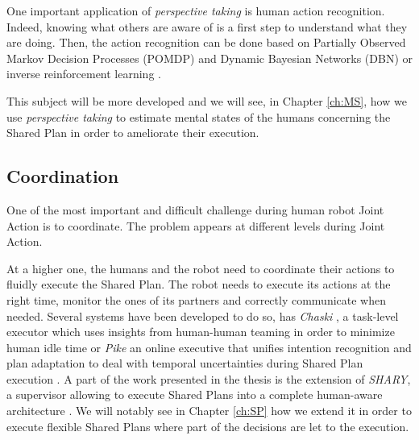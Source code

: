 \documentclass[english,a4paper,11pt,twoside]{StyleThese}
\begin{document}
One important application of \textit{perspective taking} is human action recognition. Indeed, knowing what others are aware of is a first step to understand what they are doing. Then, the action recognition can be done based on Partially Observed Markov Decision Processes (POMDP) and Dynamic Bayesian Networks (DBN) \cite{baker2014modeling} or inverse reinforcement learning \cite{nagai2015probabilistic}.

This subject will be more developed and we will see, in Chapter \ref{ch:MS}, how we use \textit{perspective taking} to estimate mental states of the humans concerning the Shared Plan in order to ameliorate their execution.


\subsection{Coordination}

\label{subsec:coordination_robot}

One of the most important and difficult challenge during human robot Joint Action is to coordinate. The problem appears at different levels during Joint Action. 

At a higher one, the humans and the robot need to coordinate their actions to fluidly execute the Shared Plan. The robot needs to execute its actions at the right time, monitor the ones of its partners and correctly communicate when needed. Several systems have been developed to do so, has \textit{Chaski} \cite{shah2011improved}, a task-level executor which uses insights from human-human teaming in order to minimize human idle time or \textit{Pike} an online executive that unifies intention recognition and plan adaptation to deal with temporal uncertainties during Shared Plan execution \cite{karpas2015robust}. A part of the work presented in the thesis is the extension of \textit{SHARY}, a supervisor allowing to execute Shared Plans into a complete human-aware architecture \cite{clodic2009shary}. We will notably see in Chapter \ref{ch:SP} how we extend it in order to execute flexible Shared Plans where part of the decisions are let to the execution.
 
\end{document}
